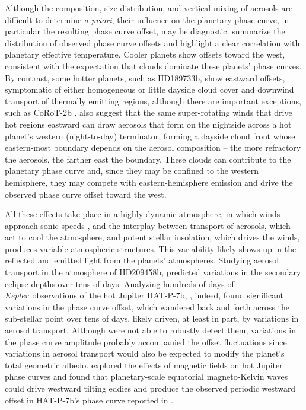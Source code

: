 \documentclass[manuscript]{aastex62}
\newcommand{\kepler}{{\it Kepler}}
\begin{document}
Although the composition, size distribution, and vertical mixing of aerosols are difficult to determine \emph{a priori}, their influence on the planetary phase curve, in particular the resulting phase curve offset, may be diagnostic. \citet{2016ApJ...828...22P} summarize the distribution of observed phase curve offsets and highlight a clear correlation with planetary effective temperature. Cooler planets show offsets toward the west, consistent with the expectation that clouds dominate these planets' phase curves. By contrast, some hotter planets, such as HD189733b, show eastward offsets, symptomatic of either homogeneous or little dayside cloud cover and downwind transport of thermally emitting regions, although there are important exceptions, such as CoRoT-2b \citep{2018NatAs...2..220D}. \citet{2016ApJ...828...22P} also suggest that the same super-rotating winds that drive hot regions eastward can draw aerosols that form on the nightside across a hot planet's western (night-to-day) terminator, forming a dayside cloud front whose eastern-most boundary depends on the aerosol composition -- the more refractory the aerosols, the farther east the boundary. These clouds can contribute to the planetary phase curve and, since they may be confined to the western hemisphere, they may compete with eastern-hemisphere emission and drive the observed phase curve offset toward the west.

All these effects take place in a highly dynamic atmosphere, in which winds approach sonic speeds \citep{2018ApJ...853..133K}, and the interplay between transport of aerosols, which act to cool the atmosphere, and potent stellar insolation, which drives the winds, produces variable atmospheric structures. This variability likely shows up in the reflected and emitted light from the planets' atmospheres. Studying aerosol transport in the atmosphere of HD209458b, \citet{2013A&A...558A..91P} predicted variations in the secondary eclipse depths over tens of days. Analyzing hundreds of days of \kepler\ observations of the hot Jupiter HAT-P-7b, \citet{2016NatAs...1E...4A}, indeed, found significant variations in the phase curve offset, which wandered back and forth across the sub-stellar point over tens of days, likely driven, at least in part, by variations in aerosol transport. Although \citet{2016NatAs...1E...4A} were not able to robustly detect them, variations in the phase curve amplitude probably accompanied the offset fluctuations since variations in aerosol transport would also be expected to modify the planet's total geometric albedo. \citet{2019ApJ...872L..27H} explored the effects of magnetic fields on hot Jupiter phase curves and found that planetary-scale equatorial magneto-Kelvin waves could drive westward tilting eddies and produce the observed periodic westward offset in HAT-P-7b's phase curve reported in \citet{2016NatAs...1E...4A}.
\end{document}
